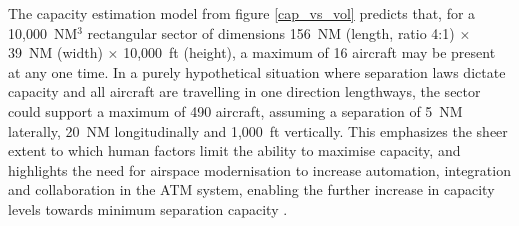 The capacity estimation model from figure \ref{cap_vs_vol} predicts that, for a 10,000~NM$^3$ rectangular sector of dimensions 156~NM (length, ratio 4:1) $\times$ 39~NM (width) $\times$ 10,000~ft (height), a maximum of 16 aircraft may be present at any one time. In a purely hypothetical situation where separation laws dictate capacity and all aircraft are travelling in one direction lengthways, the sector could support a maximum of 490 aircraft, assuming a separation of 5~NM laterally, 20~NM longitudinally and 1,000~ft vertically. This emphasizes the sheer extent to which human factors limit the ability to maximise capacity, and highlights the need for airspace modernisation to increase automation, integration and collaboration in the ATM system, enabling the further increase in capacity levels towards minimum separation capacity \cite{Gardi2016}. 








